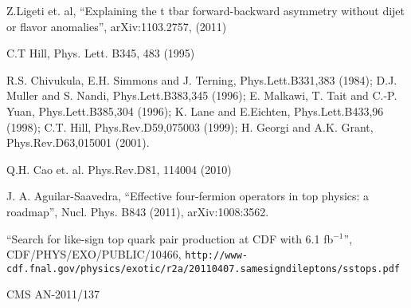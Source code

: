 \begin{thebibliography}{99}
 {Z.Ligeti et. al, ``Explaining the t tbar forward-backward asymmetry without dijet or flavor anomalies'', arXiv:1103.2757, (2011)}

 {C.T Hill, Phys. Lett. B345, 483 (1995)}

 {R.S. Chivukula, E.H. Simmons and J. Terning, Phys.Lett.B331,383 (1984); D.J. Muller and S. Nandi, Phys.Lett.B383,345 (1996); E. Malkawi, T. Tait 
and C.-P. Yuan, Phys.Lett.B385,304 (1996); K. Lane and E.Eichten, Phys.Lett.B433,96 (1998); C.T. Hill, Phys.Rev.D59,075003 (1999); H. Georgi and A.K. Grant, 
Phys.Rev.D63,015001 (2001).}

 {Q.H. Cao et. al. Phys.Rev.D81, 114004 (2010)}

 {J. A. Aguilar-Saavedra, 
``Effective four-fermion operators in top physics: a roadmap'', 
Nucl. Phys. B843 (2011), arXiv:1008:3562.}

 {``Search for like-sign top quark pair production at CDF with 6.1 fb$^{-1}$''}, CDF/PHYS/EXO/PUBLIC/10466, 
{\tt http://www-cdf.fnal.gov/physics/exotic/r2a/20110407.samesigndileptons/sstops.pdf}

 {CMS AN-2011/137}




\end{thebibliography}







